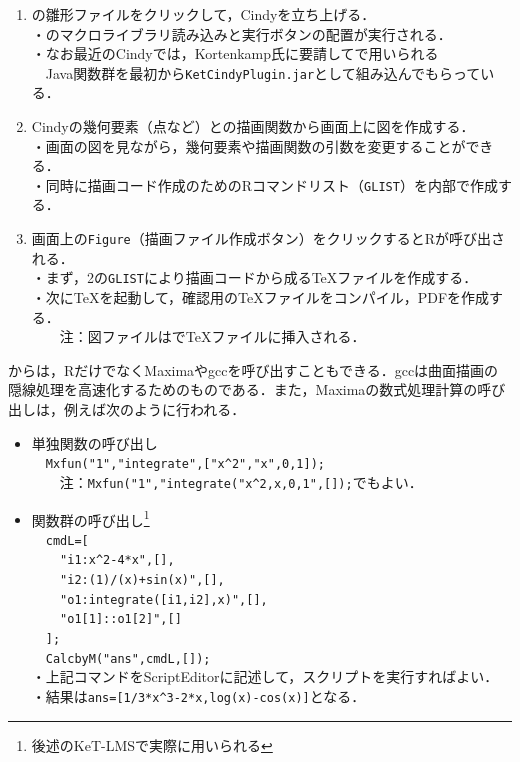 \documentclass[a4j,12pt]{ujarticle}
\begin{document}
\begin{enumerate}
\item \ketcindy の雛形ファイルをクリックして，Cindyを立ち上げる．\\
・\ketcindy のマクロライブラリ読み込みと実行ボタンの配置が実行される．\\
・なお最近のCindyでは，Kortenkamp氏に要請して\ketcindy で用いられる\\
　Java関数群を最初から\verb|KetCindyPlugin.jar|として組み込んでもらっている．\vspace{-2mm}
\item Cindyの幾何要素（点など）と\ketcindy の描画関数から画面上に図を作成する．\\
・画面の図を見ながら，幾何要素や描画関数の引数を変更することができる．\\
・同時に描画コード作成のためのRコマンドリスト（\verb|GLIST|）を内部で作成する．

\vspace{-2mm}
\item 画面上の\verb|Figure|（描画ファイル作成ボタン）をクリックするとRが呼び出される．\\
・まず，2の\verb|GLIST|により描画コードから成る\TeX ファイルを作成する．\\
・次に\TeX を起動して，確認用の\TeX ファイルをコンパイル，PDFを作成する．\\
　　注：図ファイルは\verb||で\TeX ファイルに挿入される．\vspace{-1mm}
\end{enumerate}

\ketcindy からは，RだけでなくMaximaやgccを呼び出すこともできる．gccは\ketcindy 曲面描画の隠線処理を高速化するためのものである．また，Maximaの数式処理計算の呼び出しは，例えば次のように行われる．\vspace{-1mm}

\begin{itemize}
\item 単独関数の呼び出し\\
　\verb|Mxfun("1","integrate",["x^2","x",0,1]);|\\
　　注：\verb|Mxfun("1","integrate("x^2,x,0,1",[]);|でもよい．\vspace{-2mm}
\item 関数群の呼び出し\footnote{後述のKeT-LMSで実際に用いられる}\\
　\verb|cmdL=[|\\
　\verb|  "i1:x^2-4*x",[],|\\
　\verb|  "i2:(1)/(x)+sin(x)",[],|\\
　\verb|  "o1:integrate([i1,i2],x)",[],|\\
　\verb|  "o1[1]::o1[2]",[]|\\
　\verb|];|\\
　\verb|CalcbyM("ans",cmdL,[]);|\\
・上記コマンドをScriptEditorに記述して，スクリプトを実行すればよい．\\
・結果は\verb|ans=[1/3*x^3-2*x,log(x)-cos(x)]|となる．\vspace{-1mm}
\end{itemize}
\end{document}
